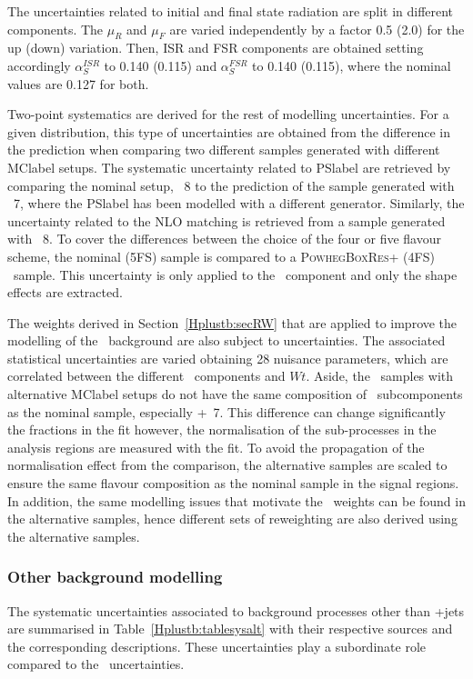 The uncertainties related to initial and final state radiation are split in different components. The $\mu_R$ and $\mu_F$ are varied independently by a factor 0.5 (2.0) for the up (down) variation. Then, ISR and FSR components are obtained setting accordingly $\alpha_S^{ISR}$ to 0.140 (0.115) and $\alpha_S^{FSR}$ to 0.140 (0.115), where the nominal values are 0.127 for both.

Two-point systematics are derived for the rest of modelling uncertainties. For a given distribution, this type of uncertainties are obtained from the difference in the prediction when comparing two different samples generated with different \acrshort{MClabel} setups. The systematic uncertainty related to \acrshort{PSlabel} are retrieved by comparing the nominal setup, \POWHEGPYTHIA~8 to the prediction of the sample generated with \POWHEGHERWIG~7, where the \acrshort{PSlabel} has been modelled with a different generator. Similarly, the uncertainty related to the NLO matching is retrieved from a sample generated with \MGMCatNLOPYTHIA~8. 
To cover the differences between the choice of the four or five flavour scheme, the nominal (5FS) sample is compared to a \textsc{PowhegBoxRes}+ (4FS) \ttb\ sample. This uncertainty is only applied to the \ttb\ component and only the shape effects are extracted.

The weights derived in Section~\ref{Hplustb:secRW} that are applied to improve the modelling of the \ttbar\ background are also subject to uncertainties. The associated statistical uncertainties are varied obtaining 28 nuisance parameters, which are correlated between the different \ttbar\ components and $Wt$. Aside, the \ttbar\ samples with alternative \acrshort{MClabel} setups do not have the same composition of \ttbar\ subcomponents as the nominal sample, especially \POWHEGBOX+\HERWIG~7. This difference can change significantly the fractions in the fit however, the normalisation of the sub-processes in the analysis regions are measured with the fit. To avoid the propagation of the normalisation effect from the comparison, the alternative samples are scaled to ensure the same flavour composition as the nominal sample in the signal regions. In addition, the same modelling issues that motivate the \ttbar\ weights can be found in the alternative samples, hence different sets of reweighting are also derived using the alternative samples.

\subsubsection{Other background modelling}
The systematic uncertainties associated to background processes other than \ttbar+jets are summarised in Table~\ref{Hplustb:tablesysalt} with their respective sources and the corresponding descriptions. These uncertainties play a subordinate role compared to the \ttbar\ uncertainties.

